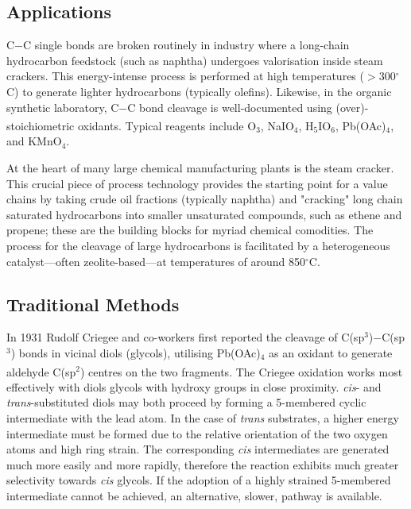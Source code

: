 \subsection{Applications}

C$-$C single bonds are broken routinely in industry where a long-chain hydrocarbon feedstock (such as naphtha) undergoes valorisation inside steam crackers. This energy-intense process is performed at high temperatures ($>$300$^{\circ}$C) to generate lighter hydrocarbons (typically olefins). Likewise, in the organic synthetic laboratory, C$-$C bond cleavage is well-documented using (over)-stoichiometric oxidants. Typical reagents include O$_3$,\textsuperscript{\cite{saliu:2012, suarez-bertoa:2012}} NaIO$_4$,\textsuperscript{\cite{binder:2008}} H$_5$IO$_6$, Pb(OAc)$_4$,\textsuperscript{\cite{criegee:1931}} and KMnO$_4$.

At the heart of many large chemical manufacturing plants is the steam cracker. This crucial piece of process technology provides the starting point for a value chains by taking crude oil fractions (typically naphtha) and "cracking" long chain saturated hydrocarbons into smaller unsaturated compounds, such as ethene and propene; these are the building blocks for myriad chemical comodities. The process for the cleavage of large hydrocarbons is facilitated by a heterogeneous catalyst---often zeolite-based---at temperatures of around 850$^{\circ}$C.

\subsection{Traditional Methods}

\noindent In 1931 Rudolf Criegee and co-workers first reported the cleavage of C(sp$^3$)$-$C(sp$^3$) bonds in vicinal diols (glycols), utilising Pb(OAc)$_4$ as an oxidant to generate aldehyde C(sp$^2$) centres on the two fragments.\textsuperscript{\cite{criegee:1931}} The Criegee oxidation works most effectively with diols glycols with hydroxy groups in close proximity.  \textit{cis}- and \textit{trans}-substituted diols may both proceed by forming a 5-membered cyclic intermediate with the lead atom. In the case of \textit{trans} substrates, a higher energy intermediate must be formed due to the relative orientation of the two oxygen atoms and high ring strain. The corresponding \textit{cis} intermediates are generated much more easily and more rapidly, therefore the reaction exhibits much greater selectivity towards \textit{cis} glycols. If the adoption of a highly strained 5-membered intermediate cannot be achieved, an alternative, slower, pathway is available.

